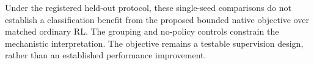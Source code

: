 Under the registered held-out protocol, these single-seed comparisons do not establish a classification benefit from the proposed bounded native objective over matched ordinary RL. The grouping and no-policy controls constrain the mechanistic interpretation. The objective remains a testable supervision design, rather than an established performance improvement.
